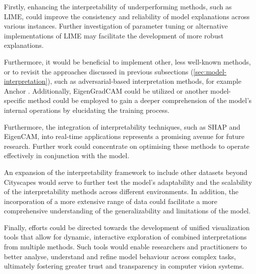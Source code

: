 Firstly, enhancing the interpretability of underperforming methods, such as LIME, could improve the consistency and reliability of model explanations across various instances.
Further investigation of parameter tuning or alternative implementations of LIME may facilitate the development of more robust explanations.

Furthermore, it would be beneficial to implement other, less well-known methods, or to revisit the approaches discussed in previous subsections (\ref{sec:model-interpretation}), such as adversarial-based interpretation methods, for example Anchor \cite{LIANG2021168}.
Additionally, EigenGradCAM could be utilized or another model-specific method could be employed to gain a deeper comprehension of the model's internal operations by elucidating the training process.

Furthermore, the integration of interpretability techniques, such as SHAP and EigenCAM, into real-time applications represents a promising avenue for future research.
Further work could concentrate on optimising these methods to operate effectively in conjunction with the model.

An expansion of the interpretability framework to include other datasets beyond Cityscapes would serve to further test the model's adaptability and the scalability of the interpretability methods across different environments. In addition, the incorporation of a more extensive range of data could facilitate a more comprehensive understanding of the generalizability and limitations of the model.

Finally, efforts could be directed towards the development of unified visualization tools that allow for dynamic, interactive exploration of combined interpretations from multiple methods.
Such tools would enable researchers and practitioners to better analyse, understand and refine model behaviour across complex tasks, ultimately fostering greater trust and transparency in computer vision systems.


